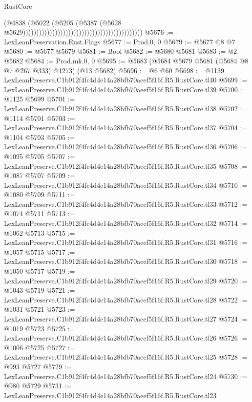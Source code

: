 \begin{lexlean}{RustCore}
\begin{coremodule}
                                                                                    (@4838
                                                                                      (@5022
                                                                                        (@5205
                                                                                          (@5387
                                                                                            (@5628
                                                                                              @5629)))))))))))))))))))))))))))))))))))))))))))))
@5676 := LexLeanPreservation.Rust.Flags
@5677 := Prod.{0, 0}
@5679 := @5677 @8 @7
@5680 := @5677 @5679
@5681 := Bool
@5682 := @5680 @5681
@5683 := @2 @5682
@5684 := Prod.mk.{0, 0}
@5695 := @5683 (@5684 @5679 @5681 (@5684 @8 @7 @267 @333) @1273) (@13 @5682)
@5696 := @6 @60
@5698 := @1139 LexLeanPreserve.C1b912f4fc4d4e14a28bfb70aeef5f16f.R5.RustCore.tl40
@5699 := LexLeanPreserve.C1b912f4fc4d4e14a28bfb70aeef5f16f.R5.RustCore.tl39
@5700 := @1125 @5699
@5701 := LexLeanPreserve.C1b912f4fc4d4e14a28bfb70aeef5f16f.R5.RustCore.tl38
@5702 := @1114 @5701
@5703 := LexLeanPreserve.C1b912f4fc4d4e14a28bfb70aeef5f16f.R5.RustCore.tl37
@5704 := @1104 @5703
@5705 := LexLeanPreserve.C1b912f4fc4d4e14a28bfb70aeef5f16f.R5.RustCore.tl36
@5706 := @1095 @5705
@5707 := LexLeanPreserve.C1b912f4fc4d4e14a28bfb70aeef5f16f.R5.RustCore.tl35
@5708 := @1087 @5707
@5709 := LexLeanPreserve.C1b912f4fc4d4e14a28bfb70aeef5f16f.R5.RustCore.tl34
@5710 := @1080 @5709
@5711 := LexLeanPreserve.C1b912f4fc4d4e14a28bfb70aeef5f16f.R5.RustCore.tl33
@5712 := @1074 @5711
@5713 := LexLeanPreserve.C1b912f4fc4d4e14a28bfb70aeef5f16f.R5.RustCore.tl32
@5714 := @1062 @5713
@5715 := LexLeanPreserve.C1b912f4fc4d4e14a28bfb70aeef5f16f.R5.RustCore.tl31
@5716 := @1057 @5715
@5717 := LexLeanPreserve.C1b912f4fc4d4e14a28bfb70aeef5f16f.R5.RustCore.tl30
@5718 := @1050 @5717
@5719 := LexLeanPreserve.C1b912f4fc4d4e14a28bfb70aeef5f16f.R5.RustCore.tl29
@5720 := @1043 @5719
@5721 := LexLeanPreserve.C1b912f4fc4d4e14a28bfb70aeef5f16f.R5.RustCore.tl28
@5722 := @1031 @5721
@5723 := LexLeanPreserve.C1b912f4fc4d4e14a28bfb70aeef5f16f.R5.RustCore.tl27
@5724 := @1019 @5723
@5725 := LexLeanPreserve.C1b912f4fc4d4e14a28bfb70aeef5f16f.R5.RustCore.tl26
@5726 := @1006 @5725
@5727 := LexLeanPreserve.C1b912f4fc4d4e14a28bfb70aeef5f16f.R5.RustCore.tl25
@5728 := @993 @5727
@5729 := LexLeanPreserve.C1b912f4fc4d4e14a28bfb70aeef5f16f.R5.RustCore.tl24
@5730 := @980 @5729
@5731 := LexLeanPreserve.C1b912f4fc4d4e14a28bfb70aeef5f16f.R5.RustCore.tl23

\end{coremodule}
\end{lexlean}

